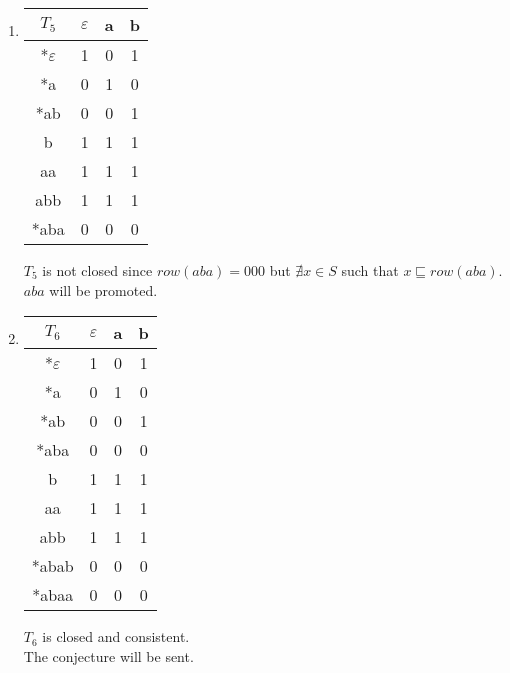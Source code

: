 \begin{enumerate}
  \item \begin{minipage}{0.3\textwidth}
          \begin{tabular}{c||c |c|c}
            $T_5$          & $\varepsilon$ & a & b \\
            \hline\hline
            *$\varepsilon$ & 1             & 0 & 1 \\
            *a             & 0             & 1 & 0 \\
            *ab            & 0             & 0 & 1 \\
            \hline\hline
            b              & 1             & 1 & 1 \\
            aa             & 1             & 1 & 1 \\
            abb            & 1             & 1 & 1 \\
            *aba           & 0             & 0 & 0 \\
          \end{tabular}
        \end{minipage}\quad
        \begin{minipage}{0.6\textwidth}
          $T_5$ is not closed since $row(aba) = 000$ but $\nexists x \in S$ such that $x \sqsubseteq row(aba)$.\\
          $aba$ will be promoted.
        \end{minipage}

  \item \begin{minipage}{0.3\textwidth}
          \begin{tabular}{c||c |c|c}
            $T_6$          & $\varepsilon$ & a & b \\
            \hline\hline
            *$\varepsilon$ & 1             & 0 & 1 \\
            *a             & 0             & 1 & 0 \\
            *ab            & 0             & 0 & 1 \\
            *aba           & 0             & 0 & 0 \\
            \hline\hline
            b              & 1             & 1 & 1 \\
            aa             & 1             & 1 & 1 \\
            abb            & 1             & 1 & 1 \\
            *abab          & 0             & 0 & 0 \\
            *abaa          & 0             & 0 & 0 \\
          \end{tabular}
        \end{minipage}\quad
        \begin{minipage}{0.6\textwidth}
          $T_6$ is closed and consistent.\\
          The conjecture will be sent.
        \end{minipage}


\end{enumerate}
